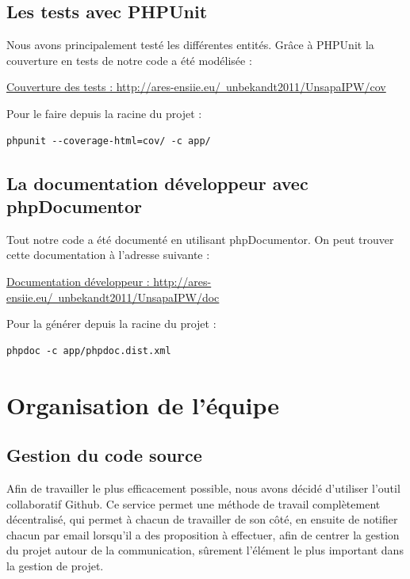 \documentclass{report}
\begin{document}
    \subsection{Les tests avec PHPUnit}
	  Nous avons principalement testé les différentes entités. Grâce à PHPUnit
      la couverture en tests de notre code a été modélisée : 

			\href{http://ares-ensiie.eu/~unbekandt2011/UnsapaIPW/cov}{Couverture des tests : http://ares-ensiie.eu/~unbekandt2011/UnsapaIPW/cov}

      Pour le faire depuis la racine du projet :
      \begin{verbatim}phpunit --coverage-html=cov/ -c app/\end{verbatim}

    \subsection{La documentation développeur avec phpDocumentor}
			Tout notre code a été documenté en utilisant phpDocumentor. On peut 
      trouver cette documentation à l'adresse suivante :

			\href{http://ares-ensiie.eu/~unbekandt2011/UnsapaIPW/doc}{Documentation développeur : http://ares-ensiie.eu/~unbekandt2011/UnsapaIPW/doc}

      Pour la générer depuis la racine du projet : 
      \begin{verbatim}phpdoc -c app/phpdoc.dist.xml\end{verbatim}    
  \clearpage
  
  \section{Organisation de l'équipe}
    \subsection{Gestion du code source}
      Afin de travailler le plus efficacement possible, nous avons décidé d'utiliser l'outil 
    collaboratif Github. Ce service permet une méthode de travail complètement
    décentralisé, qui permet à chacun de travailler de son côté, en ensuite
    de notifier chacun par email lorsqu'il a des proposition à effectuer, afin
    de centrer la gestion du projet autour de la communication, sûrement l'élément
    le plus important dans la gestion de projet.
    
\end{document}
